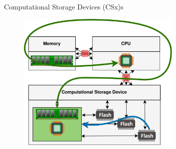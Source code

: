 \documentclass{beamer}
\begin{document}
\begin{frame}{Computational Storage Devices (CSx)s}
	\begingroup
	\small
	\begin{figure}
		\centering
		\includegraphics[width=0.7\textwidth]{resources/images/csd.png}
	\end{figure}
	\endgroup
\end{frame}
\end{document}
